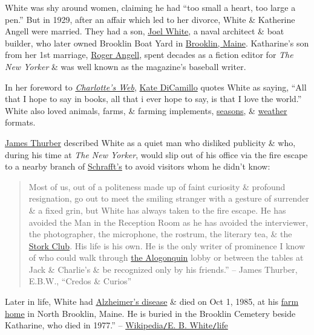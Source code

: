 \documentclass[oneside]{book}
\numberwithin{equation}{section}
\begin{document}
White was shy around women, claiming he had ``too small a heart, too large a pen.'' But in 1929, after an affair which led to her divorce, White \& Katherine Angell were married. They had a son, \href{https://en.wikipedia.org/wiki/Joel_White}{Joel White}, a naval architect \& boat builder, who later owned Brooklin Boat Yard in \href{https://en.wikipedia.org/wiki/Brooklin,_Maine}{Brooklin, Maine}. Katharine's son from her 1st marriage, \href{https://en.wikipedia.org/wiki/Roger_Angell}{Roger Angell}, spent decades as a fiction editor for \textit{The New Yorker} \& was well known as the magazine's baseball writer.

In her foreword to \href{https://en.wikipedia.org/wiki/Charlotte%27s_Web}{\textit{Charlotte's Web}}, \href{https://en.wikipedia.org/wiki/Kate_DiCamillo}{Kate DiCamillo} quotes White as saying, ``All that I hope to say in books, all that i ever hope to say, is that I love the world.'' White also loved animals, farms, \& farming implements, \href{https://en.wikipedia.org/wiki/Seasons}{seasons}, \& \href{https://en.wikipedia.org/wiki/Weather}{weather} formats.

\href{https://en.wikipedia.org/wiki/James_Thurber}{James Thurber} described White as a quiet man who disliked publicity \& who, during his time at \textit{The New Yorker}, would slip out of his office via the fire escape to a nearby branch of \href{https://en.wikipedia.org/wiki/Schrafft%27s_(restaurant_chain)}{Schrafft's} to avoid visitors whom he didn't know:
\begin{quotation}
	Most of us, out of a politeness made up of faint curiosity \& profound resignation, go out to meet the smiling stranger with a gesture of surrender \& a fixed grin, but White has always taken to the fire escape. He has avoided the Man in the Reception Room as he has avoided the interviewer, the photographer, the microphone, the rostrum, the literary tea, \& the \href{https://en.wikipedia.org/wiki/Stork_Club}{Stork Club}. His life is his own. He is the only writer of prominence I know of who could walk through \href{https://en.wikipedia.org/wiki/Algonquin_Hotel}{the Alogonquin} lobby or between the tables at Jack \& Charlie's \& be recognized only by his friends.'' -- James Thurber, E.B.W., ``Credos \& Curios''
\end{quotation}
Later in life, White had \href{https://en.wikipedia.org/wiki/Alzheimer%27s_disease}{Alzheimer's disease} \& died on Oct 1, 1985, at his \href{https://en.wikipedia.org/wiki/E.B._White_House}{farm home} in North Brooklin, Maine. He is buried in the Brooklin Cemetery beside Katharine, who died in 1977.'' -- \href{https://en.wikipedia.org/wiki/E._B._White#Life}{Wikipedia\texttt{/}E. B. White\texttt{/}life}
\end{document}
